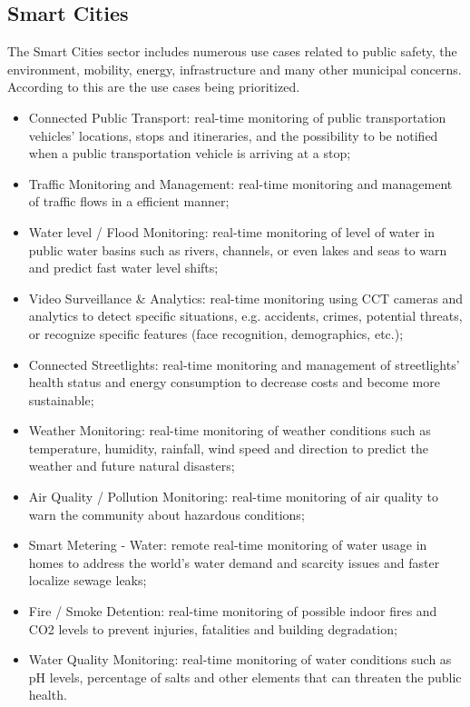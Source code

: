 \subsection{Smart Cities}
\label{subsec:stateofart:areas:cities}

The Smart Cities sector includes numerous use cases related to public safety, the environment, mobility, energy, infrastructure and many other municipal concerns. According to \cite{iot-smart-city-prioritized} this are the use cases being prioritized.

\begin{itemize}
    \item Connected Public Transport: real-time monitoring of public transportation vehicles' locations, stops and itineraries, and the possibility to be notified when a public transportation vehicle is arriving at a stop;
    \item Traffic Monitoring and Management: real-time monitoring and management of traffic flows in a efficient manner;
    \item Water level / Flood Monitoring: real-time monitoring of level of water in public water basins such as rivers, channels, or even lakes and seas to warn and predict fast water level shifts;
    \item Video Surveillance \& Analytics: real-time monitoring using \gls{CCT} cameras and analytics to detect specific situations, e.g. accidents, crimes, potential threats, or recognize specific features (face recognition, demographics, etc.);
    \item Connected Streetlights: real-time monitoring and management of streetlights' health status and energy consumption to decrease costs and become more sustainable;
    \item Weather Monitoring: real-time monitoring of weather conditions such as temperature, humidity, rainfall, wind speed and direction to predict the weather and future natural disasters;
    \item Air Quality / Pollution Monitoring: real-time monitoring of air quality to warn the community about hazardous conditions;
    \item Smart Metering - Water: remote real-time monitoring of water usage in homes to address the world's water demand and scarcity issues and faster localize sewage leaks;
    \item Fire / Smoke Detention: real-time monitoring of possible indoor fires and CO2 levels to prevent injuries, fatalities and building degradation;
    \item Water Quality Monitoring: real-time monitoring of water conditions such as pH levels, percentage of salts and other elements that can threaten the public health.
\end{itemize}

